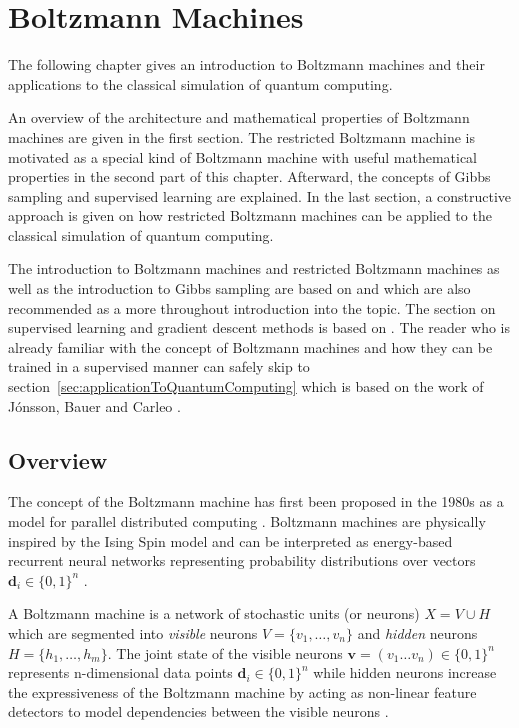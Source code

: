\chapter{Boltzmann Machines}
The following chapter gives an introduction to Boltzmann machines and their applications to the classical 
simulation of quantum computing.

An overview of the architecture and mathematical properties of Boltzmann machines are given in the first section. The restricted Boltzmann machine is motivated as a special kind of Boltzmann machine with useful mathematical properties in the second part of this chapter. Afterward, the concepts of Gibbs sampling and supervised learning are explained.
In the last section, a constructive approach is given on how restricted Boltzmann machines 
can be applied to the classical simulation of quantum computing.

The introduction to Boltzmann machines and restricted Boltzmann machines as well as the introduction 
to Gibbs sampling are based on \cite{montufar2018restricted} and 
\cite{fischer2012introduction} which are also recommended as a more throughout introduction 
into the topic. The section on supervised learning and gradient descent methods is based on \cite{ruder2016overview}. The 
reader who is already familiar with the concept of Boltzmann machines and how they can be trained in a supervised 
manner can safely skip
to section~\ref{sec:applicationToQuantumComputing} which is based on the work of J\'{o}nsson, Bauer and Carleo \cite{jnsson2018neuralnetwork}.

\section{Overview}
The concept of the Boltzmann machine has first been proposed in the 1980s as a
model for parallel distributed computing \cite{hinton1983analyzing}. Boltzmann machines are physically inspired by the Ising Spin model and can be interpreted as energy-based recurrent neural networks representing probability distributions
over vectors $\bm{d}_i \in \{0,1\}^n$ \cite{ackley1985learning}.

A Boltzmann machine is a network of stochastic units (or neurons) $X=V \cup H$ which are segmented into
\textit{visible} neurons $V=\{v_1, \dots, v_n\}$ and \textit{hidden} neurons $H=\{h_1, \dots, h_m\}$.
The joint state of the visible neurons $\bm{v} = (v_1\dots v_n) \in \{0,1\}^n$ represents n-dimensional data
points $\bm{d}_i \in \{0,1\}^n$ while hidden neurons increase the expressiveness of the Boltzmann machine by acting as non-linear feature 
detectors to model dependencies between the visible neurons \cite{hinton2010boltzmann}.

